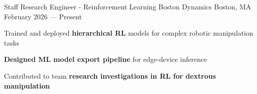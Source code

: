 
\let\oldhref\href
\renewcommand{\href}[2]{\oldhref{#1}{\underline{#2}}}

\begin{cventries}


  \cventry
    {Staff Research Engineer - Reinforcement Learning}
    {Boston Dynamics}
    {Boston, MA}
    {February 2026 --- Present}
    {
      \begin{cvitems}
        \item{Trained and deployed \textbf{hierarchical RL} models for complex robotic manipulation tasks}
        \item{\textbf{Designed ML model export pipeline} for edge-device inference}
        \item{Contributed to team \textbf{research investigations in RL for dextrous manipulation}}
      \end{cvitems}
    }


\end{cventries}

